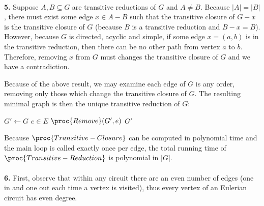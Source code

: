 \documentclass{article}
\begin{document}
\paragraph{} \textbf{5.}
Suppose $A,B \subseteq G$ are transitive reductions of $G$ and $A \neq B$.  Because $|A|=|B|$, there must exist some edge $x \in A - B$ such that the transitive closure of $G - x$ is the transitive closure of $G$ (because $B$ is a transitive reduction and $B-x = B$).  However, because $G$ is directed, acyclic and simple, if some edge $x=(a,b)$ is in the transitive reduction, then there can be no other path from vertex $a$ to $b$.  Therefore, removing $x$ from $G$ must changes the transitive closure of $G$ and we have a contradiction.

Because of the above result, we may examine each edge of $G$ is any order, removing only those which change the transitive closure of $G$.  The resulting minimal graph is then the unique transitive reduction of $G$:

\begin{codebox}
\li $G' \gets G$
\li \For {} $e \in E$
\li     \Do {}
\li		$\proc{Remove}(G',e)$
        \End
\li \Return $G'$
\end{codebox}

Because $\proc{Transitive-Closure}$ can be computed in polynomial time and the main loop is called exactly once per edge, the total running time of $\proc{Transitive-Reduction}$ is polynomial in $|G|$.

\paragraph{} \textbf{6.}
First, observe that within any circuit there are an even number of edges (one in and one out each time a vertex is visited), thus every vertex of an Eulerian circuit has even degree.  
\end{document}
